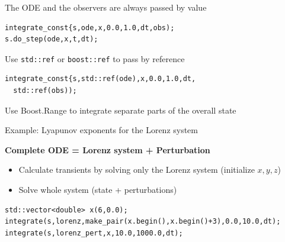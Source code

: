 \begin{frame}[fragile]

\vspace{2ex}

 The ODE and the observers are always passed by value

 \begin{lstlisting}
integrate_const{s,ode,x,0.0,1.0,dt,obs);
s.do_step(ode,x,t,dt);
 \end{lstlisting}

\pause

\vspace{2ex}
Use {\tt std::ref} or {\tt boost::ref} to pass by reference
 \begin{lstlisting}
integrate_const{s,std::ref(ode),x,0.0,1.0,dt,
  std::ref(obs));
 \end{lstlisting}

\end{frame}



\begin{frame}[fragile]

 \vspace{2ex}
 Use Boost.Range to integrate separate parts of the overall state

 \vspace{2ex}
 Example: Lyapunov exponents for the Lorenz system

 \vspace{2ex}

 \centerline{\bf Complete ODE = Lorenz system + Perturbation}


 \begin{itemize}
  \item Calculate transients by solving only the Lorenz system (initialize $x,y,z$)
  \item Solve whole system (state + perturbations)
 \end{itemize}

\vspace{2ex}

 \begin{lstlisting}
std::vector<double> x(6,0.0);
integrate(s,lorenz,make_pair(x.begin(),x.begin()+3),0.0,10.0,dt);
integrate(s,lorenz_pert,x,10.0,1000.0,dt);
 \end{lstlisting}



\end{frame}



